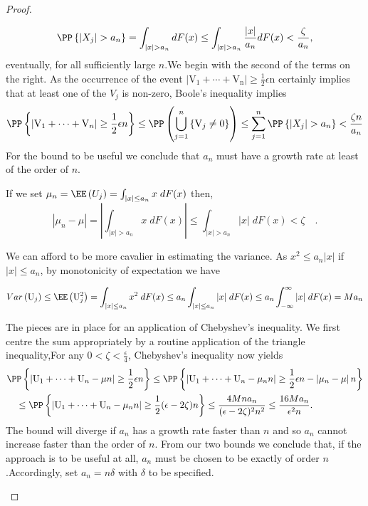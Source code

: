 \documentclass[15pt,a4paper]{book}
\theoremstyle{definition}
\begin{document}
\begin{proof}
\begin{tcolorbox}[title=Analysis on $a_n$...,colback=blue!2!white,colframe=blue!55!black]
        \[\PP\left\{\left|X_{j}\right|>a_{n}\right\}=\int_{|x|>a_{n}} d F(x) \leq \int_{|x|>a_{n}} \frac{|x|}{a_{n}} d F(x)<\frac{\zeta}{a_{n}},
        \]
        eventually, for all sufficiently large $n$.We begin with the second of the terms on the right. As the occurrence of the event $\left\lvert\mathrm{V}_{1}+\cdots+\mathrm{V}_{\mathrm{n}}\right\rvert \geq \frac{1}{2} \epsilon \mathrm{n}$ certainly implies that at least one of the $V_{j}$ is non-zero, Boole's inequality implies
        \[\PP\left\{\left|\mathrm{V}_{1}+\cdots+\mathrm{V}_{n}\right| \geq \frac{1}{2} \epsilon n\right\} \leq \PP\left(\bigcup_{j=1}^{n}\left\{\mathrm{V}_{j} \neq 0\right\}\right) \leq \sum_{j=1}^{n} \PP\left\{\left|X_{j}\right|>a_{n}\right\}<\frac{\zeta n}{a_{n}}\]
        For the bound to be useful we conclude that $a_{n}$ must have a growth rate at least of the order of $n$.

        If we set $\mu_{n}=\EE\left(U_{j}\right)=\int_{|x| \leq a_{n}} x\; dF(x)$ then, 
$$
\left|\mu_{n}-\mu\right|=\left|\int_{|x|>a_{n}} x \;dF(x)\right| \leq \int_{|x|>a_{n}}|x| \;dF(x)<\zeta \quad .
$$

We can afford to be more cavalier in estimating the variance. As $x^{2} \leq a_{n}|x|$ if $|x| \leq a_{n}$, by monotonicity of expectation we have

\[
Var\left(\mathrm{U}_{j}\right) \leq \EE\left(\mathrm{U}_{j}^{2}\right)=\int_{|x| \leq a_{n}} x^{2} \;dF(x) \leq a_n \int_{|x| \leq a_{n}}|x| \;dF(x) \leq a_n \int_{-\infty}^{\infty}|x| \; dF(x)=M a_{n}
\]


The pieces are in place for an application of Chebyshev's inequality. We first centre the sum appropriately by a routine application of the triangle inequality,For any $0<\zeta<\frac{\epsilon}{4}$, Chebyshev's inequality now yields
$$
\begin{aligned}
    & \PP\left\{\left|\mathrm{U}_{1}+\cdots+\mathrm{U}_{n}-\mu n\right| \geq \frac{1}{2} \epsilon{n}\right\} \leq \PP\left\{\left|\mathrm{U}_{1}+\cdots+\mathrm{U}_{n}-\mu_{n} n\right| \geq \frac{1}{2} \epsilon{n}-\left|\mu_{n}-\mu\right| n\right\} \\ & \quad \leq \PP\left\{\left|\mathrm{U}_{1}+\cdots+\mathrm{U}_{n}-\mu_{n} n\right| \geq \frac{1}{2}(\epsilon-2 \zeta) n\right\} \leq \frac{4 M n a_{n}}{(\epsilon-2 \zeta)^{2} n^{2}} \leq \frac{16 M a_{n}}{\epsilon^{2} n} .
\end{aligned}
$$
The bound will diverge if $a_{n}$ has a growth rate faster than $n$ and so $a_{n}$ cannot increase faster than the order of $n$. From our two bounds we conclude that, if the approach is to be useful at all, $a_{n}$ must be chosen to be exactly of order $n$.Accordingly, set $a_{n}={n\delta}$ with $\delta$ to be specified.


\end{tcolorbox}
\end{proof}
\end{document}
